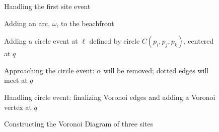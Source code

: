 \documentclass[12pt,twoside]{reedthesis}
\begin{document}
      \begin{figure}[!htb]
        \centering
        \begin{subtable}{0.475\textwidth}
          \centering
          
          \caption{Handling the first site event}
          \label{fig:fortune_0}
        \end{subtable}%
        \begin{subtable}{0.475\textwidth}
          \centering
          
          \caption{Adding an arc, $\omega$, to the beachfront}
          \label{fig:fortune_1}
        \end{subtable}
      \ContinuedFloat
        \begin{subtable}{0.475\textwidth}
          \centering
          
          \caption{Adding a circle event at $\ell$ defined by circle $C(p_{i}, p_{j}, p_{k})$, centered at $q$}
          \label{fig:fortune_2}
        \end{subtable}
        \begin{subtable}{0.475\textwidth}
          \centering
          
          \caption{Approaching the circle event: $\alpha$ will be removed; dotted edges will meet at $q$}
          \label{fig:fortune_3}
        \end{subtable}
      \ContinuedFloat
      \centering
        \begin{subtable}{0.475\textwidth}
          \centering
          
          \caption{Handling circle event: finalizing Voronoi edges and adding a Voronoi vertex at $q$}
          \label{fig:fortune_done}
        \end{subtable}
        \caption{Constructing the Voronoi Diagram of three sites}
        \label{fig:construct_vorof_3}
      \end{figure}
  \clearpage
\end{document}
